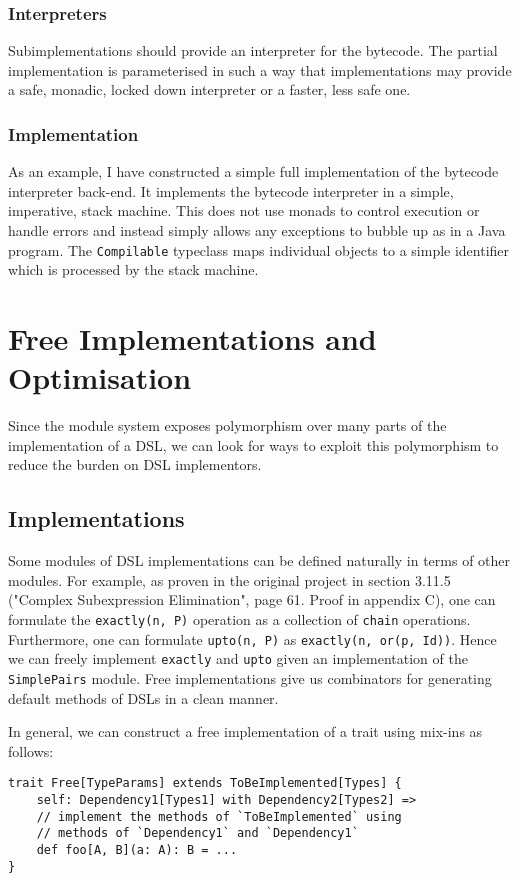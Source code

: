 \documentclass{report}
\newcommand \2[0]{\textbf{2}}
\newcommand \3[0]{\textbf{3}}
\begin{document}
\subsection{Interpreters}
Subimplementations should provide an interpreter for the bytecode. The partial implementation is parameterised in such a way that implementations may provide a safe, monadic, locked down interpreter or a faster, less safe one.

\subsection{Implementation}
As an example, I have constructed a simple full implementation of the bytecode interpreter back-end. It implements the bytecode interpreter in a simple, imperative, stack machine. This does not use monads to control execution or handle errors and instead simply allows any exceptions to bubble up as in a Java program. The \texttt{Compilable} typeclass maps individual objects to a simple identifier which is processed by the stack machine.

\chapter{Free Implementations and Optimisation}
Since the module system exposes polymorphism over many parts of the implementation of a DSL, we can look for ways to exploit this polymorphism to reduce the burden on DSL implementors.

\section{Implementations}
Some modules of DSL implementations can be defined naturally in terms of other modules. For example, as proven in the original project in section 3.11.5 ("Complex Subexpression Elimination", page 61. Proof in appendix C), one can formulate the \texttt{exactly(n, P)} operation as a collection of \texttt{chain} operations. Furthermore, one can formulate \texttt{upto(n, P)} as \texttt{exactly(n, or(p, Id))}. Hence we can freely implement \texttt{exactly} and \texttt{upto} given an implementation of the \texttt{SimplePairs} module. Free implementations give us combinators for generating default methods of DSLs in a clean manner.

In general, we can construct a free implementation of a trait using mix-ins as follows:

\begin{verbatim}
trait Free[TypeParams] extends ToBeImplemented[Types] {
    self: Dependency1[Types1] with Dependency2[Types2] =>
    // implement the methods of `ToBeImplemented` using 
    // methods of `Dependency1` and `Dependency1`
    def foo[A, B](a: A): B = ...
}
\end{verbatim}
\end{document}
